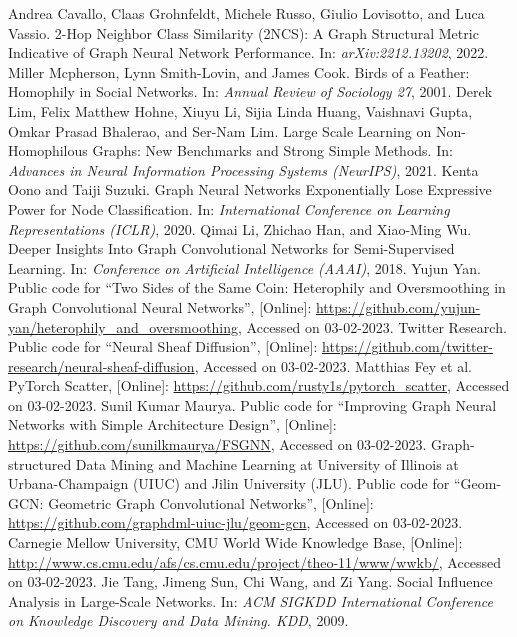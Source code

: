 \documentclass[conference]{IEEEtran}
\begin{document}
\begin{thebibliography}{00}
 Andrea Cavallo, Claas Grohnfeldt, Michele Russo, Giulio Lovisotto, and Luca Vassio. 2-Hop Neighbor Class Similarity (2NCS): A Graph Structural Metric Indicative of Graph Neural Network Performance. In: \textit{arXiv:2212.13202}, 2022.
Miller Mcpherson, Lynn Smith-Lovin, and James Cook. Birds of a Feather: Homophily in Social Networks. In: \textit{Annual Review of Sociology 27}, 2001.
Derek Lim, Felix Matthew Hohne, Xiuyu Li, Sijia Linda Huang, Vaishnavi Gupta, Omkar Prasad Bhalerao, and Ser-Nam Lim. Large Scale Learning on Non-Homophilous Graphs: New Benchmarks and Strong Simple Methods. In: \textit{Advances in Neural Information Processing Systems (NeurIPS)}, 2021.
Kenta Oono  and Taiji Suzuki. Graph Neural Networks Exponentially Lose Expressive Power for Node Classification. In: \textit{International Conference on Learning Representations (ICLR)}, 2020.
 Qimai Li, Zhichao Han, and Xiao-Ming Wu. Deeper Insights Into Graph Convolutional Networks for Semi-Supervised Learning. In: \textit{Conference on Artificial Intelligence (AAAI)}, 2018.
 Yujun Yan. Public code for ``Two Sides of the Same Coin: Heterophily and Oversmoothing in Graph Convolutional Neural Networks'', [Online]: \url{https://github.com/yujun-yan/heterophily\_and\_oversmoothing}, Accessed on 03-02-2023.
 Twitter Research. Public code for ``Neural Sheaf Diffusion'', [Online]: \url{https://github.com/twitter-research/neural-sheaf-diffusion}, Accessed on 03-02-2023.
 Matthias Fey et al. PyTorch Scatter, [Online]: \url{https://github.com/rusty1s/pytorch\_scatter}, Accessed on 03-02-2023.
 Sunil Kumar Maurya. Public code for ``Improving Graph Neural Networks with Simple Architecture Design'', [Online]: \url{https://github.com/sunilkmaurya/FSGNN}, Accessed on 03-02-2023.
 Graph-structured Data Mining and Machine Learning at University of Illinois at Urbana-Champaign (UIUC) and Jilin University (JLU). Public code for ``Geom-GCN: Geometric Graph Convolutional Networks'', [Online]: \url{https://github.com/graphdml-uiuc-jlu/geom-gcn}, Accessed on 03-02-2023.
Carnegie Mellow University, CMU World Wide Knowledge Base, [Online]: \url{http://www.cs.cmu.edu/afs/cs.cmu.edu/project/theo-11/www/wwkb/}, Accessed on 03-02-2023.
Jie Tang, Jimeng Sun, Chi Wang, and Zi Yang. Social Influence Analysis in Large-Scale Networks. In: \textit{ACM SIGKDD International Conference on Knowledge Discovery and Data Mining. KDD}, 2009.

\end{thebibliography}
\end{document}
